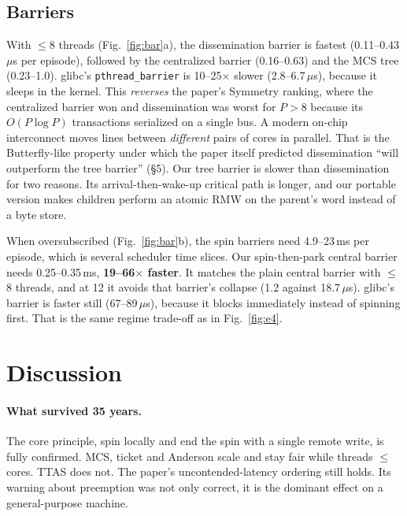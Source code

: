 \documentclass[10pt,twocolumn]{article}
\begin{document}
\subsection{Barriers}
With $\le$8 threads (Fig.~\ref{fig:bar}a), the dissemination barrier is fastest (0.11--0.43\,$\mu$s per episode),
followed by the centralized barrier (0.16--0.63) and the MCS tree (0.23--1.0). glibc's
\texttt{pthread\_barrier} is 10--25$\times$ slower (2.8--6.7\,$\mu$s), because it sleeps in the kernel.
This \emph{reverses} the paper's Symmetry ranking, where the centralized barrier won and dissemination was
worst for $P>8$ because its $O(P\log P)$ transactions serialized on a single bus. A modern on-chip interconnect
moves lines between \emph{different} pairs of cores in parallel. That is the Butterfly-like property under
which the paper itself predicted dissemination ``will outperform the tree barrier'' (\S5). Our tree
barrier is slower than dissemination for two reasons. Its arrival-then-wake-up critical path is longer,
and our portable version makes children perform an atomic RMW on the parent's word instead of a byte store.

When oversubscribed (Fig.~\ref{fig:bar}b), the spin barriers need 4.9--23\,ms per episode, which is several
scheduler time slices. Our spin-then-park central barrier needs 0.25--0.35\,ms, \textbf{19--66$\times$ faster}.
It matches the plain central barrier with $\le$8 threads, and at 12 it avoids that barrier's collapse (1.2 against
18.7\,$\mu$s). glibc's barrier is faster still (67--89\,$\mu$s), because it blocks immediately instead of
spinning first. That is the same regime trade-off as in Fig.~\ref{fig:e4}.

\section{Discussion}
\paragraph{What survived 35 years.} The core principle, spin locally and end the spin with a single remote
write, is fully confirmed. MCS, ticket and Anderson scale and stay fair while threads $\le$ cores. TTAS
does not. The paper's uncontended-latency ordering still holds. Its warning about preemption was not only
correct, it is the dominant effect on a general-purpose machine.
\end{document}
